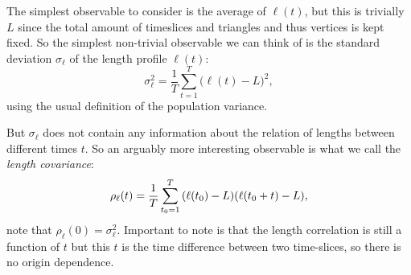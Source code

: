 The simplest observable to consider is the average of $\ell(t)$, but this is trivially $L$ since the total amount of timeslices and triangles and thus vertices is kept fixed.
So the simplest non-trivial observable we can think of is the standard deviation $\sigma_\ell$ of the length profile $\ell(t)$:
\begin{equation}\label{eq:std_meas}
    \sigma_\ell^2 = \frac{1}{T} \sum_{t = 1}^{T} \Big(\ell(t) - L\Big)^2,
\end{equation}
using the usual definition of the population variance.

But $\sigma_\ell$ does not contain any information about the relation of lengths between different times $t$.
So an arguably more interesting observable is what we call the \emph{length covariance}:
\begin{equation}\label{eq:cov_meas}
    \rho_\ell(t) = \frac{1}{T} \sum_{t_0 = 1}^{T} \qty(\ell(t_0) - L)\qty(\ell(t_0 + t) - L),
\end{equation}
note that $\rho_\ell(0) = \sigma_\ell^2$.
Important to note is that the length correlation is still a function of $t$ but this $t$ is the time difference between two time-slices, so there is no origin dependence.